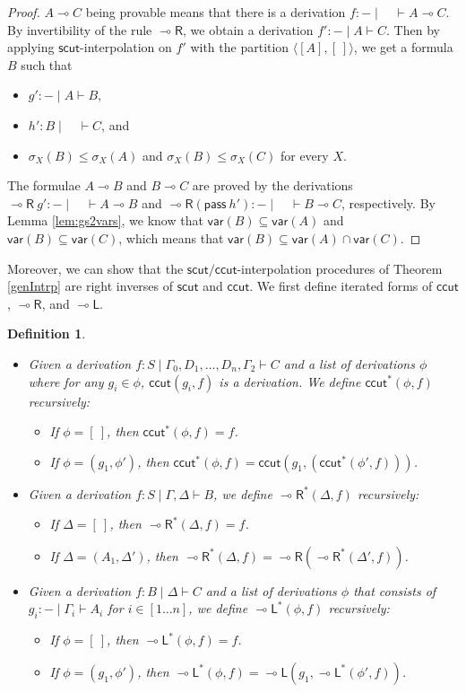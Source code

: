 \documentclass[sn-mathphys-num]{sn-jnl}%
\newcommand{\GG}{\Gamma}
\newcommand{\GD}{\Delta}
\newcommand{\vd}{\vdash}
\newcommand{\pass}{\mathsf{pass}}
\newcommand{\lolli}{\multimap}
\newcommand{\lleft}{{\lolli}\mathsf{L}}
\newcommand{\lright}{{\lolli}\mathsf{R}}
\newcommand{\sls}{\slash}
\newcommand{\mf}[1]{\mathsf{#1}}
\newcommand{\gs}[1]{\sigma_{X} (#1)}
\newcommand{\vars}[1]{\mf{var} (#1)}
\theoremstyle{thmstyleone}%
\theoremstyle{thmstyletwo}%
\theoremstyle{thmstylethree}%
\newtheorem{definition}[theorem]{Definition}%
\begin{document}
\begin{proof}
$A \lolli C$ being provable means that there is a derivation $f : {-} \mid \quad \vd A \lolli C$. 
By invertibility of the rule $\lright$, we obtain a derivation $f' : {-} \mid A \vd C$.
Then by applying $\mf{scut}$-interpolation on $f'$ with the partition $\langle [A ], [\ ]\rangle$, we get a formula $B$ such that 
\begin{itemize}
  \item[--] $g': {-} \mid A \vd B$,
  \item[--] $h': B \mid \quad \vd C$, and 
  \item[--] $\gs{B} \leq \gs{A} $ and $ \gs{B} \leq \gs{C}$ for every $X$.
\end{itemize}
The formulae $A \lolli B$ and $B \lolli C$ are proved by the derivations $\lright \ g' : {-} \mid \quad \vd A \lolli B$ and $\lright (\pass \ h') : {-} \mid \quad \vd B \lolli C$, respectively.
By Lemma \ref{lem:gs2vars}, we know that $\vars{B} \subseteq \vars{A}$ and $\vars{B} \subseteq \vars{C}$, which means that $\vars{B} \subseteq \vars{A} \cap \vars{C}$.
\end{proof}
Moreover, we can show that the $\mf{scut}\sls \mf{ccut}$-interpolation procedures of Theorem \ref{genIntrp} are right inverses of $\mf{scut}$ and $\mf{ccut}$.
We first define iterated forms of $\mf{ccut}$, $\lright$, and $\lleft$.
\begin{definition}
~
\begin{itemize}
  \item  Given a derivation $f : S \mid \GG_0 , D_1 , \dots, D_n , \GG_2 \vd C$ and a list of derivations $\phi$ where for any $g_i \in \phi$, $\mf{ccut}(g_i , f)$ is a derivation. 
  We define $\mf{ccut}^* (\phi , f)$ recursively:
  \begin{itemize}
    \item[--] If $\phi = [\ ]$, then $\mf{ccut}^* (\phi , f) = f$.
    \item[--] If $\phi = (g_1 , \phi')$, then $\mf{ccut}^* (\phi , f) = \mf{ccut} (g_1 , (\mf{ccut}^* (\phi' , f)))$.
  \end{itemize}
  \item Given a derivation $f : S \mid \GG , \GD \vd B$, we define $\lright^* (\GD , f)$ recursively:
  \begin{itemize}
    \item If $\GD = [\ ]$, then $\lright^* (\GD, f) = f$.
    \item If $\GD = (A_1 , \GD')$, then $\lright^* (\GD , f) = \lright (\lright^* (\GD' , f))$.
  \end{itemize}
  \item Given a derivation $f : B \mid \GD \vd C$ and a list of derivations $\phi$ that consists of $g_i : {-} \mid \GG_i \vd A_i$ for $i \in [1 \dots n]$, we define $\lleft^* (\phi , f)$ recursively:
  \begin{itemize}
    \item If $\phi = [\ ]$, then $\lleft^* (\phi , f) = f$.
    \item If $\phi = (g_1 , \phi')$, then $\lleft^* (\phi , f) = \lleft (g_1 , \lleft^* (\phi' , f))$.
  \end{itemize}
\end{itemize}
\end{definition}
\end{document}

